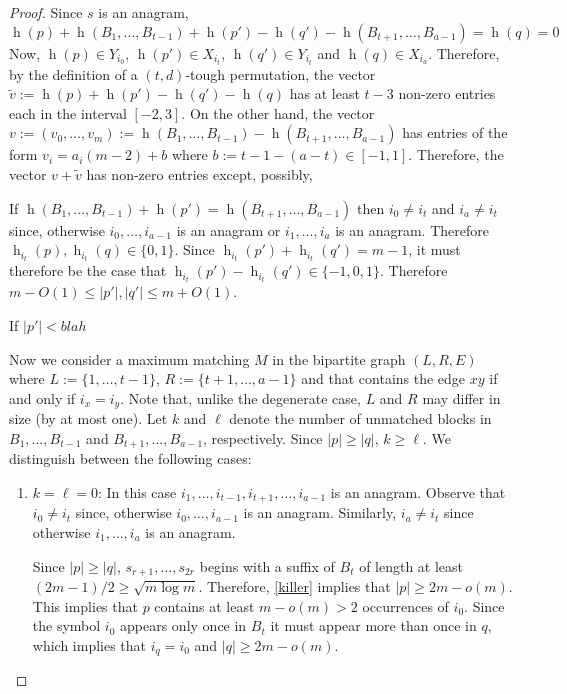 \documentclass[kpfonts]{patmorin}
\DeclareMathOperator{\hist}{h}
\begin{document}
\begin{proof}
    Since $s$ is an anagram,
    \[  \hist(p) + \hist(B_1,\ldots,B_{t-1})+\hist(p')
        - \hist(q') - \hist(B_{t+1},\ldots,B_{a-1}) = \hist(q) = 0
    \]
    Now, $\hist(p)\in Y_{i_0}$, $\hist(p')\in X_{i_t}$, $\hist(q')\in Y_{i_t}$ and $\hist(q)\in X_{i_a}$.  Therefore, by the definition of a $(t,d)$-tough permutation, the vector $\tilde{v}:=\hist(p)+\hist(p')-\hist(q')-\hist(q)$ has at least $t-3$ non-zero entries each in the interval $[-2,3]$.  On the other hand, the vector $v:=(v_0,\ldots,v_m):=\hist(B_1,\ldots,B_{t-1}) - \hist(B_{t+1},\ldots,B_{a-1})$ has entries of the form $v_i=a_i(m-2)+b$ where $b:=t-1-(a-t)\in[-1,1]$.  Therefore, the vector $v+\tilde{v}$ has non-zero entries except, possibly,






    If $\hist(B_1,\ldots,B_{t-1})+\hist(p') = \hist(B_{t+1},\ldots,B_{a-1})$ then $i_0\neq i_t$ and $i_a\neq i_t$ since, otherwise $i_0,\ldots,i_{a-1}$ is an anagram or $i_1,\ldots,i_a$ is an anagram.  Therefore $\hist_{i_t}(p),\hist_{i_t}(q)\in \{0,1\}$. Since $\hist_{i_t}(p')+\hist_{i_t}(q')=m-1$, it must therefore be the case that
    $\hist_{i_t}(p')-\hist_{i_t}(q')\in\{-1,0,1\}$.  Therefore $m-O(1)\le |p'|,|q'| \le m+O(1)$.


    If $|p'|<blah$




    Now we consider a maximum matching $M$ in the bipartite graph $(L,R,E)$ where $L:=\{1,\ldots,t-1\}$, $R:=\{t+1,\ldots,a-1\}$ and that contains the edge $xy$ if and only if $i_x=i_y$.  Note that, unlike the degenerate case, $L$ and $R$ may differ in size (by at most one).  Let $k$ and $\ell$ denote the number of unmatched blocks in $B_1,\ldots,B_{t-1}$ and $B_{t+1},\ldots,B_{a-1}$, respectively.  Since $|p|\ge |q|$, $k\ge\ell$.  We distinguish between the following cases:

    \begin{enumerate}
        \item $k=\ell=0$: In this case $i_1,\ldots,i_{t-1},i_{t+1},\ldots,i_{a-1}$ is an anagram.  Observe that $i_0\neq i_t$ since, otherwise $i_0,\ldots,i_{a-1}$ is an anagram.  Similarly, $i_a\neq i_t$ since otherwise $i_1,\ldots,i_a$ is an anagram.

        Since $|p|\ge |q|$, $s_{r+1},\ldots,s_{2r}$ begins with a suffix of $B_t$ of length at least $(2m-1)/2 \ge \sqrt{m\log m}$. Therefore, \cref{killer} implies that $|p|\ge 2m-o(m)$.  This implies that $p$ contains at least $m-o(m)>2$ occurrences of $i_0$.  Since the symbol $i_0$ appears only once in $B_t$ it must appear more than once in $q$, which implies that $i_q=i_0$ and $|q|\ge 2m-o(m)$.


\end{enumerate}
\end{proof}
\end{document}
